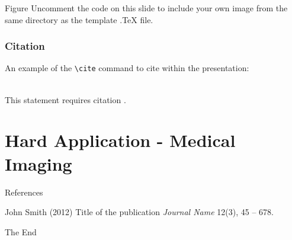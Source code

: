 \documentclass[aspectratio=169,xcolor=dvipsnames]{beamer}
\begin{document}
	
	\begin{frame}{Figure}
		Uncomment the code on this slide to include your own image from the same directory as the template .TeX file.
	\end{frame}
	
	
	\begin{frame}[fragile] %
		\frametitle{Citation}
		An example of the \verb|\cite| command to cite within the presentation:\\~
		
		This statement requires citation \cite{p1}.
	\end{frame}
	
	\section{Hard Application - Medical Imaging}
	
	\begin{frame}{References}
		\footnotesize{
			\begin{thebibliography}{99}
				 John Smith (2012)
				\newblock Title of the publication
				\newblock \emph{Journal Name} 12(3), 45 -- 678.
			\end{thebibliography}
		}
	\end{frame}
	
	
	\begin{frame}
		\Huge{\centerline{The End}}
	\end{frame}
	
	
\end{document}
